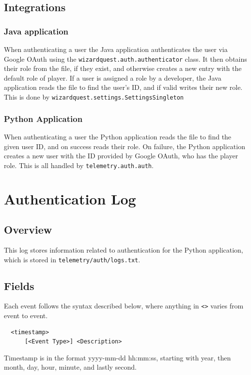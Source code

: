 \documentclass[11pt]{article}
\begin{document}
\subsection{Integrations}

\subsubsection{Java application}
When authenticating a user the Java application authenticates the user via Google OAuth using the \verb|wizardquest.auth.authenticator| class. It then obtains their role from the file, if they exist, and otherwise creates a new entry with the default role of player. If a user is assigned a role by a developer, the Java application reads the file to find the user's ID, and if valid writes their new role. This is done by \verb|wizardquest.settings.SettingsSingleton|

\subsubsection{Python Application}
When authenticating a user the Python application reads the file to find the given user ID, and on success reads their role. On failure, the Python application creates a new user with the ID provided by Google OAuth, who has the player role. This is all handled by \verb|telemetry.auth.auth|.

\section{Authentication Log}
\subsection{Overview}
This log stores information related to authentication for the Python application, which is stored in \verb|telemetry/auth/logs.txt|.

\subsection{Fields}
Each event follows the syntax described below, where anything in \verb|<>| varies from event to event.
\begin{verbatim}
  <timestamp>
      [<Event Type>] <Description>
\end{verbatim}

Timestamp is in the format yyyy-mm-dd hh:mm:ss, starting with year, then month, day, hour, minute, and lastly second.
\end{document}
